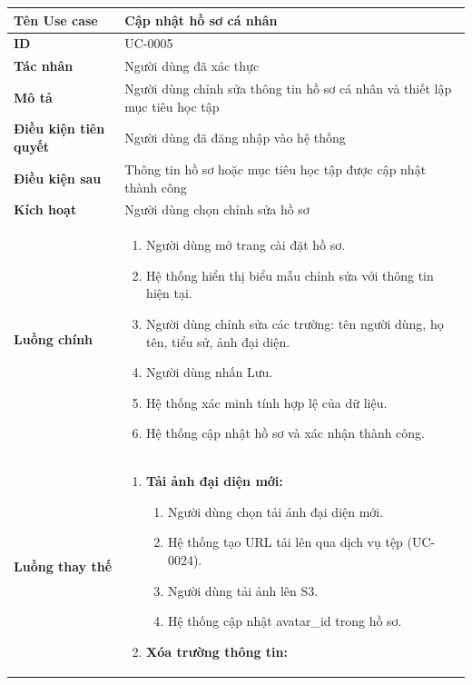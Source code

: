 {
\renewcommand{\arraystretch}{1.5}

\begin{tabularx}{\textwidth}{|>{\raggedright\arraybackslash}X|>{\raggedright\arraybackslash}X|}
\hline
\textbf{Tên Use case} & Cập nhật hồ sơ cá nhân \\
\hline
\textbf{ID} & UC-0005 \\
\hline
\textbf{Tác nhân} & Người dùng đã xác thực \\
\hline
\textbf{Mô tả} & Người dùng chỉnh sửa thông tin hồ sơ cá nhân và thiết lập mục tiêu học tập \\
\hline
\textbf{Điều kiện tiên quyết} & Người dùng đã đăng nhập vào hệ thống \\
\hline
\textbf{Điều kiện sau} & Thông tin hồ sơ hoặc mục tiêu học tập được cập nhật thành công \\
\hline
\textbf{Kích hoạt} & Người dùng chọn chỉnh sửa hồ sơ \\
\hline
\textbf{Luồng chính} &
\begin{enumerate}
    \item Người dùng mở trang cài đặt hồ sơ.
    \item Hệ thống hiển thị biểu mẫu chỉnh sửa với thông tin hiện tại.
    \item Người dùng chỉnh sửa các trường: tên người dùng, họ tên, tiểu sử, ảnh đại diện.
    \item Người dùng nhấn Lưu.
    \item Hệ thống xác minh tính hợp lệ của dữ liệu.
    \item Hệ thống cập nhật hồ sơ và xác nhận thành công.
\end{enumerate} \\
\hline
\textbf{Luồng thay thế} &
\begin{enumerate}
    \item \textbf{Tải ảnh đại diện mới:}
    \begin{enumerate}
        \item[3A.] Người dùng chọn tải ảnh đại diện mới.
        \item[4A.] Hệ thống tạo URL tải lên qua dịch vụ tệp (UC-0024).
        \item[5A.] Người dùng tải ảnh lên S3.
        \item[6A.] Hệ thống cập nhật avatar\_id trong hồ sơ.
    \end{enumerate}
    \item \textbf{Xóa trường thông tin:}
    \begin{enumerate}

\end{enumerate}
\end{enumerate}
\end{tabularx}}
